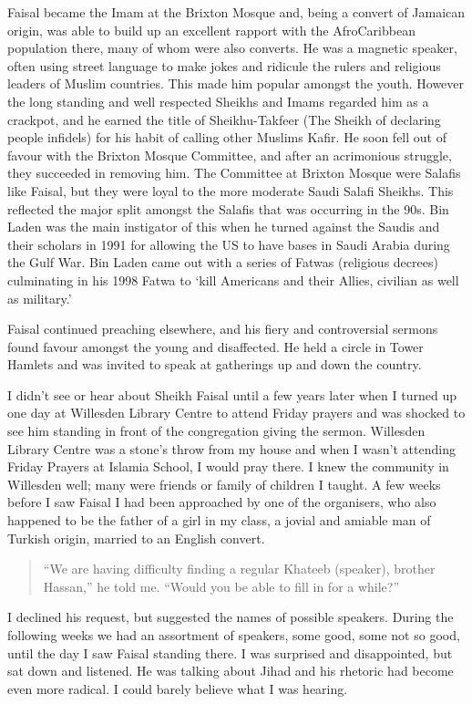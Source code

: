 \documentclass[12pt]{memoir}
\begin{document}
Faisal became the Imam at the Brixton Mosque and,
being a convert of Jamaican origin,
was able to build up an excellent rapport
with the Afro\–Caribbean population there, many of whom were also converts.
He was a magnetic speaker, often using street language to make jokes
and ridicule the rulers and religious leaders of Muslim countries.
This made him popular amongst the youth.
However the long standing and well respected Sheikhs and Imams
regarded him as a crackpot,
and he earned the title of Sheikhu-Takfeer
(The Sheikh of declaring people infidels)
for his habit of calling other Muslims Kafir.
He soon fell out of favour with the Brixton Mosque Committee,
and after an acrimonious struggle, they succeeded in removing him.
The Committee at Brixton Mosque were Salafis like Faisal,
but they were loyal to the more moderate Saudi Salafi Sheikhs.
This reflected the major split amongst the Salafis
that was occurring in the 90s.
Bin Laden was the main instigator of this when he turned against the Saudis
and their scholars in 1991 for allowing the US
to have bases in Saudi Arabia during the Gulf War.
Bin Laden came out with a series of Fatwas (religious decrees)
culminating in his 1998 Fatwa to
‘kill Americans and their Allies, civilian as well as military.’

Faisal continued preaching elsewhere,
and his fiery and controversial sermons found favour
amongst the young and disaffected.
He held a circle in Tower Hamlets and was invited to speak
at gatherings up and down the country.

I didn’t see or hear about Sheikh Faisal until a few years later
when I turned up one day at Willesden Library Centre to attend Friday prayers
and was shocked to see him standing in front of the congregation
giving the sermon.
Willesden Library Centre was a stone’s throw from my house
and when I wasn’t attending Friday Prayers at Islamia School,
I would pray there.
I knew the community in Willesden well;
many were friends or family of children I taught.
A few weeks before I saw Faisal I had been approached by one of the organisers,
who also happened to be the father of a girl in my class,
a jovial and amiable man of Turkish origin, married to an English convert.

\begin{quote}
“We are having difficulty finding a regular Khateeb (speaker),
brother Hassan,” he told me.
“Would you be able to fill in for a while?”
\end{quote}

I declined his request, but suggested the names of possible speakers.
During the following weeks we had an assortment of speakers, some good,
some not so good, until the day I saw  Faisal
standing there.
I was surprised and disappointed, but sat down and listened.
He was talking about Jihad and his rhetoric had become even more radical.
I could barely believe what I was hearing.
\end{document}
